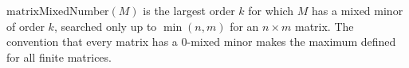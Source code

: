 \(\mathrm{matrixMixedNumber}(M)\) is the largest order \(k\) for which \(M\)
has a mixed minor of order \(k\), searched only up to
\(\min(n,m)\) for an \(n\times m\) matrix.  The convention that every matrix
has a \(0\)-mixed minor makes the maximum defined for all finite matrices.
